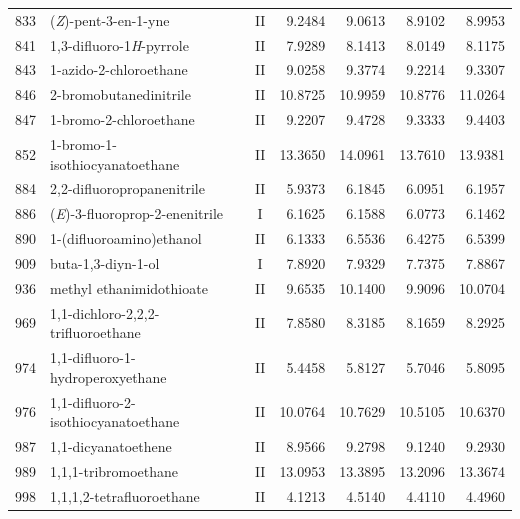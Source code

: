 \begin{longtable}{rlcd{2.5}d{2.5}d{2.5}d{2.5}}
    833  & (\textit{Z})-pent-3-en-1-yne                           & II & 9.2484  & 9.0613  & 8.9102  & 8.9953  \\
    841  & 1,3-difluoro-1\textit{H}-pyrrole                       & II & 7.9289  & 8.1413  & 8.0149  & 8.1175  \\
    843  & 1-azido-2-chloroethane                                 & II & 9.0258  & 9.3774  & 9.2214  & 9.3307  \\
    846  & 2-bromobutanedinitrile                                 & II & 10.8725 & 10.9959 & 10.8776 & 11.0264 \\
    847  & 1-bromo-2-chloroethane                                 & II & 9.2207  & 9.4728  & 9.3333  & 9.4403  \\
    852  & 1-bromo-1-isothiocyanatoethane                         & II & 13.3650 & 14.0961 & 13.7610 & 13.9381 \\
    884  & 2,2-difluoropropanenitrile                             & II & 5.9373  & 6.1845  & 6.0951  & 6.1957  \\
    886  & (\textit{E})-3-fluoroprop-2-enenitrile                 & I  & 6.1625  & 6.1588  & 6.0773  & 6.1462  \\
    890  & 1-(difluoroamino)ethanol                               & II & 6.1333  & 6.5536  & 6.4275  & 6.5399  \\
    909  & buta-1,3-diyn-1-ol                                     & I  & 7.8920  & 7.9329  & 7.7375  & 7.8867  \\
    936  & methyl ethanimidothioate                               & II & 9.6535  & 10.1400 & 9.9096  & 10.0704 \\
    969  & 1,1-dichloro-2,2,2-trifluoroethane                     & II & 7.8580  & 8.3185  & 8.1659  & 8.2925  \\
    974  & 1,1-difluoro-1-hydroperoxyethane                       & II & 5.4458  & 5.8127  & 5.7046  & 5.8095  \\
    976  & 1,1-difluoro-2-isothiocyanatoethane                    & II & 10.0764 & 10.7629 & 10.5105 & 10.6370 \\
    987  & 1,1-dicyanatoethene                                    & II & 8.9566  & 9.2798  & 9.1240  & 9.2930  \\
    989  & 1,1,1-tribromoethane                                   & II & 13.0953 & 13.3895 & 13.2096 & 13.3674 \\
    998  & 1,1,1,2-tetrafluoroethane                              & II & 4.1213  & 4.5140  & 4.4110  & 4.4960  \\

\end{longtable}
